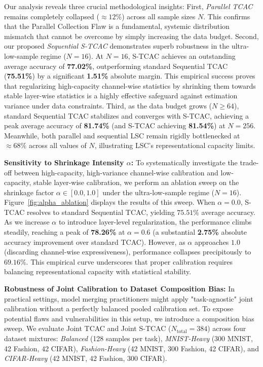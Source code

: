 \documentclass{article}
\theoremstyle{plain}
\theoremstyle{definition}
\theoremstyle{remark}
\begin{document}
Our analysis reveals three crucial methodological insights:
First, \textit{Parallel TCAC} remains completely collapsed ($\approx 12\%$) across all sample sizes $N$. This confirms that the Parallel Collection Flaw is a fundamental, systemic distribution mismatch that cannot be overcome by simply increasing the data budget. 
Second, our proposed \textit{Sequential S-TCAC} demonstrates superb robustness in the ultra-low-sample regime ($N=16$). At $N=16$, S-TCAC achieves an outstanding average accuracy of \textbf{77.02\%}, outperforming standard Sequential TCAC (\textbf{75.51\%}) by a significant \textbf{1.51\%} absolute margin. This empirical success proves that regularizing high-capacity channel-wise statistics by shrinking them towards stable layer-wise statistics is a highly effective safeguard against estimation variance under data constraints.
Third, as the data budget grows ($N \ge 64$), standard Sequential TCAC stabilizes and converges with S-TCAC, achieving a peak average accuracy of \textbf{81.74\%} (and S-TCAC achieving \textbf{81.54\%}) at $N=256$. Meanwhile, both parallel and sequential LSC remain rigidly bottlenecked at $\approx 68\%$ across all values of $N$, illustrating LSC's representational capacity limits.

\textbf{Sensitivity to Shrinkage Intensity $\alpha$:}
To systematically investigate the trade-off between high-capacity, high-variance channel-wise calibration and low-capacity, stable layer-wise calibration, we perform an ablation sweep on the shrinkage factor $\alpha \in [0.0, 1.0]$ under the ultra-low-sample regime ($N = 16$). Figure~\ref{fig:alpha_ablation} displays the results of this sweep. When $\alpha = 0.0$, S-TCAC resolves to standard Sequential TCAC, yielding $75.51\%$ average accuracy. As we increase $\alpha$ to introduce layer-level regularization, the performance climbs steadily, reaching a peak of \textbf{78.26\%} at $\alpha = 0.6$ (a substantial \textbf{2.75\%} absolute accuracy improvement over standard TCAC). However, as $\alpha$ approaches $1.0$ (discarding channel-wise expressiveness), performance collapses precipitously to $69.16\%$. This empirical curve underscores that proper calibration requires balancing representational capacity with statistical stability.

\textbf{Robustness of Joint Calibration to Dataset Composition Bias:}
In practical settings, model merging practitioners might apply "task-agnostic" joint calibration without a perfectly balanced pooled calibration set. To expose potential flaws and vulnerabilities in this setup, we introduce a composition bias sweep. We evaluate Joint TCAC and Joint S-TCAC ($N_{\text{total}}=384$) across four dataset mixtures: \textit{Balanced} (128 samples per task), \textit{MNIST-Heavy} (300 MNIST, 42 Fashion, 42 CIFAR), \textit{Fashion-Heavy} (42 MNIST, 300 Fashion, 42 CIFAR), and \textit{CIFAR-Heavy} (42 MNIST, 42 Fashion, 300 CIFAR). 
\end{document}

